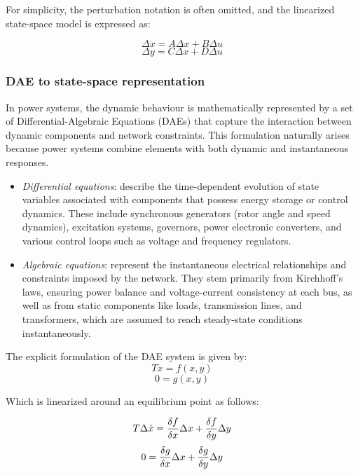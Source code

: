 For simplicity, the perturbation notation is often omitted, and the linearized state-space model is expressed as:
  
\begin{equation}
\Delta \dot{x} = A \Delta x + B \Delta u
\end{equation}
\begin{equation}
\Delta y = C \Delta x + D \Delta u
\end{equation}


\subsubsection{DAE to state-space representation}

In power systems, the dynamic behaviour is mathematically represented by a set of Differential-Algebraic Equations (DAEs) 
that capture the interaction between dynamic components and network constraints. This formulation naturally arises because power systems
 combine elements with both dynamic and instantaneous responses.

\begin{itemize}
\item \textit{Differential equations}: describe the time-dependent evolution of state variables associated with components that possess energy storage
 or control dynamics. These include synchronous generators (rotor angle and speed dynamics), excitation systems, governors, power electronic converters,
  and various control loops such as voltage and frequency regulators.
\item \textit{Algebraic equations}: represent the instantaneous electrical relationships and constraints imposed by the network. They stem primarily from Kirchhoff's laws,
 ensuring power balance and voltage-current consistency at each bus, as well as from static components like loads, transmission lines, and transformers, which are assumed
  to reach steady-state conditions instantaneously.
\end{itemize}


The explicit formulation of the DAE system is given by:
\begin{equation}
    T \dot{x} = f(x, y)
\end{equation}
\begin{equation}
    0 = g(x, y)
\end{equation}

Which is linearized around an equilibrium point as follows:

\begin{equation}
    T \Delta \dot{x} =\frac{\delta f}{\delta x}\Delta x + \frac{\delta f}{\delta y}\Delta y\\
\end{equation}
\begin{equation}
    0 =\frac{\delta g}{\delta x}\Delta x + \frac{\delta g}{\delta y}\Delta y\\
\end{equation}

